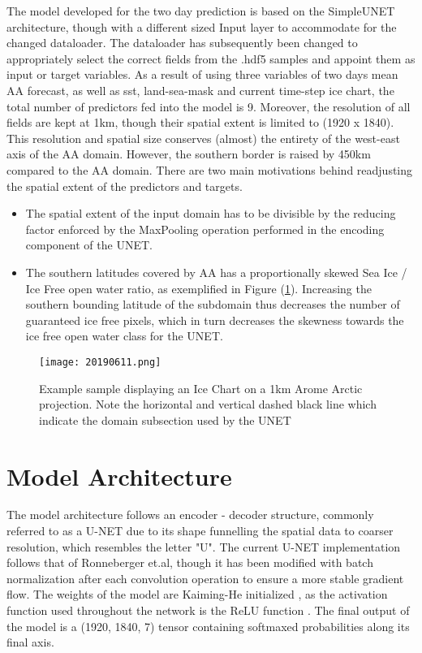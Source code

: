 The model developed for the two day prediction is based on the SimpleUNET architecture, though with a different sized Input layer to accommodate for the changed dataloader. The dataloader has subsequently been changed to appropriately select the correct fields from the .hdf5 samples and appoint them as input or target variables. As a result of using three variables of two days mean AA forecast, as well as sst, land-sea-mask and current time-step ice chart, the total number of predictors fed into the model is 9. Moreover, the resolution of all fields are kept at 1km, though their spatial extent is limited to (1920 x 1840). This resolution and spatial size conserves (almost) the entirety of the west-east axis of the AA domain. However, the southern border is raised by 450km compared to the AA domain. There are two main motivations behind readjusting the spatial extent of the predictors and targets.

\begin{itemize}
    \item[1.] The spatial extent of the input domain has to be divisible by the reducing factor enforced by the MaxPooling operation performed in the encoding component of the UNET.
    \item[2.] The southern latitudes covered by AA has a proportionally skewed Sea Ice / Ice Free open water ratio, as exemplified in Figure (\ref{fig:exampleAAsouthborder}). Increasing the southern bounding latitude of the subdomain thus decreases the number of guaranteed ice free pixels, which in turn decreases the skewness towards the ice free open water class for the UNET.
\end{itemize}

\begin{figure}
    \texttt{[image: 20190611.png]}
    \caption{\label{fig:exampleAAsouthborder}Example sample displaying an Ice Chart on a 1km Arome Arctic projection. Note the horizontal and vertical dashed black line which indicate the domain subsection used by the UNET}
\end{figure}

\section{Model Architecture}
The model architecture follows an encoder - decoder structure, commonly referred to as a U-NET \cite{Ronneberger2015} due to its shape funnelling the spatial data to coarser resolution, which resembles the letter "U". The current U-NET implementation follows that of Ronneberger et.al, though it has been modified with batch normalization after each convolution operation to ensure a more stable gradient flow. The weights of the model are Kaiming-He initialized \cite{He2015}, as the activation function used throughout the network is the ReLU function \cite{Nair2010}. The final output of the model is a (1920, 1840, 7) tensor containing softmaxed probabilities along its final axis.

